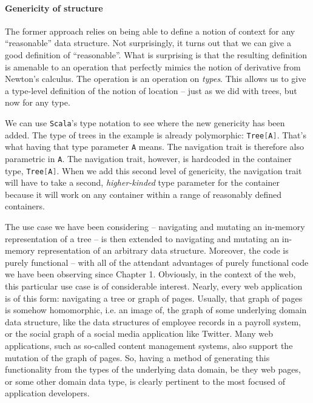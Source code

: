 \paragraph{Genericity of structure}

The former approach relies on being able to define a notion of context
for any ``reasonable'' data structure. Not surprisingly, it turns out
that we can give a good definition of ``reasonable''. What is
surprising is that the resulting definition is amenable to an
operation that perfectly mimics the notion of derivative from Newton's
calculus. The operation is an operation on \emph{types}. This allows
us to give a type-level definition of the notion of location -- just
as we did with trees, but now for any type.

We can use \texttt{Scala}'s type notation to see where the new
genericity has been added. The type of trees in the example is already
polymorphic:
\lstinline[language=Scala,mathescape=true]!Tree[A]!. That's what
having that type parameter
\lstinline[language=Scala,mathescape=true]!A! means. The navigation
trait is therefore also parametric in
\lstinline[language=Scala,mathescape=true]!A!. The navigation trait,
however, is hardcoded in the container type,
\lstinline[language=Scala,mathescape=true]!Tree[A]!. When we add this
second level of genericity, the navigation trait will have to take a
second, \emph{higher-kinded} type parameter for the container because
it will work on any container within a range of reasonably defined
containers.

The use case we have been considering -- navigating and mutating an
in-memory representation of a tree -- is then extended to navigating
and mutating an in-memory representation of an arbitrary data
structure. Moreover, the code is purely functional -- with all of the
attendant advantages of purely functional code we have been observing
since Chapter 1. Obviously, in the context of the web, this particular
use case is of considerable interest. Nearly, every web application is
of this form: navigating a tree or graph of pages. Usually, that graph
of pages is somehow homomorphic, i.e. an image of, the graph of some
underlying domain data structure, like the data structures of employee
records in a payroll system, or the social graph of a social media
application like Twitter. Many web applications, such as so-called
content management systems, also support the mutation of the graph of
pages. So, having a method of generating this functionality from the
types of the underlying data domain, be they web pages, or some other
domain data type, is clearly pertinent to the most focused of
application developers.

